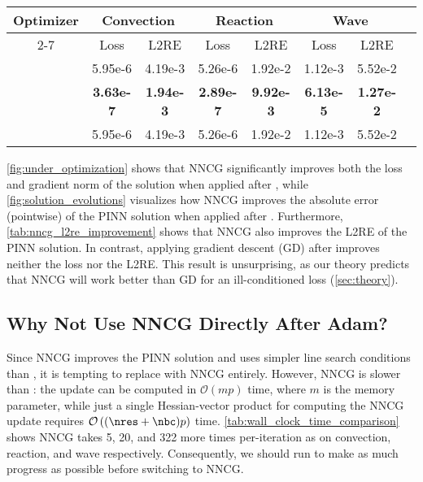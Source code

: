 \begin{table*}[t]
    \caption{Loss and L2RE after fine-tuning by NNCG and GD. NNCG outperforms both GD and the original \al{} results.}
    \vskip 0.15in
    \centering
    \scriptsize
    \begin{tabular}{|c|c|c|c|c|c|c|c|} 
    \hline 
    \multirow{2}{*}{Optimizer} & \multicolumn{2}{c|}{Convection} & \multicolumn{2}{c|}{Reaction} & \multicolumn{2}{c|}{Wave} \\ \cline{2-7}
                               & Loss & L2RE & Loss & L2RE & Loss & L2RE \\ \hline 
        \al{} & 5.95e-6 & 4.19e-3 & 5.26e-6 & 1.92e-2 & 1.12e-3 & 5.52e-2 \\
        \hline
        \aln{} & \textbf{3.63e-7} & \textbf{1.94e-3} & \textbf{2.89e-7} & \textbf{9.92e-3} & \textbf{6.13e-5} & \textbf{1.27e-2} \\
        \hline
        \alg{} & 5.95e-6 & 4.19e-3 & 5.26e-6 & 1.92e-2 & 1.12e-3 & 5.52e-2 \\
        \hline
    \end{tabular}
    \label{tab:nncg_l2re_improvement}
\end{table*}

\cref{fig:under_optimization} shows that NNCG significantly improves both the loss and gradient norm of the solution when applied after \al{}, while \cref{fig:solution_evolutions} visualizes how NNCG improves the absolute error (pointwise) of the PINN solution when applied after \al{}.
Furthermore, \cref{tab:nncg_l2re_improvement} shows that NNCG also improves the L2RE of the PINN solution.
In contrast, applying gradient descent (GD) after \al{} improves neither the loss nor the L2RE. This result is unsurprising, as our theory predicts that NNCG will work better than GD for an ill-conditioned loss (\cref{sec:theory}). 

\subsection{Why Not Use NNCG Directly After Adam?}
\label{subsec:why_not_nncg}
Since NNCG improves the PINN solution and uses simpler line search conditions than \lbfgs, it is tempting to replace \lbfgs{} with NNCG entirely.
However, NNCG is slower than \lbfgs{}: the \lbfgs{} update can be computed in $\mathcal O(mp)$ time, where $m$ is the memory parameter, while just a single Hessian-vector product for computing the NNCG update requires $\mathcal{O}\left((\nres+\nbc)p\right)$ time. \cref{tab:wall_clock_time_comparison} shows NNCG takes 5, 20, and 322 more times per-iteration as \lbfgs{} on convection, reaction, and wave respectively. 
Consequently, we should run \al{} to make as much progress as possible before switching to NNCG.

